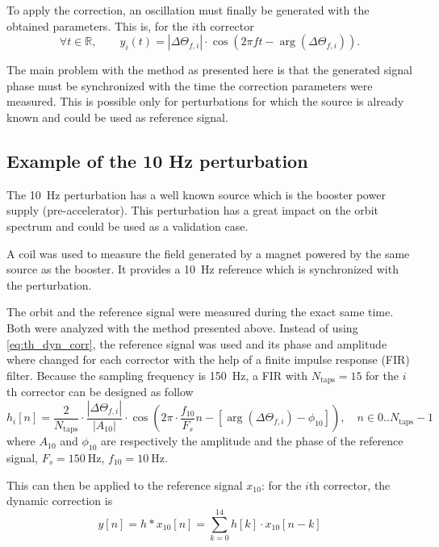 To apply the correction, an oscillation must finally be generated with the obtained parameters. This is, for the $i$th corrector
\begin{equation}\label{eq:th_dyn_corr}
\forall t \in  \mathbb{R}, \qquad y_i(t) = \left| \Delta\Theta_{f,i} \right| \cdot \cos\left(2 \pi f t - \arg\left(\Delta\Theta_{f,i}\right)\right).
\end{equation}

The main problem with the method as presented here is that the generated signal phase must be synchronized with the time the correction parameters were measured. This is possible only for perturbations for which the source is already known and could be used as reference signal.

\subsection{Example of the 10 Hz perturbation}
\label{sec:dyn_corr_ex_10Hz}
The \SI{10}{\hertz} perturbation has a well known source which is the booster power supply (pre-accelerator). This perturbation has a great impact on the orbit spectrum and could be used as a validation case.

A coil was used to measure the field generated by a magnet powered by the same source as the booster. It provides a \SI{10}{\hertz} reference which is synchronized with the perturbation.

The orbit and the reference signal were measured during the exact same time. Both were analyzed with the method presented above. Instead of using \cref{eq:th_dyn_corr}, the reference signal was used and its phase and amplitude where changed for each corrector with the help of a finite impulse response (FIR) filter. Because the sampling frequency is \SI{150}{\hertz}, a FIR with $N_\text{taps} = 15$ for the $i$th corrector can be designed as follow
\begin{equation}
	h_i[n] = \frac{2}{N_\text{taps}}\cdot \frac{\left| \Delta\Theta_{f,i} \right|}{\left|A_{10}\right|} \cdot \cos\left(2\pi\cdot \frac{f_{10}}{F_s} n - \left[\arg\left(\Delta\Theta_{f,i}\right) - \phi_{10}\right] \right),\quad n \in 0..N_\text{taps}-1
\end{equation}
where $A_{10}$ and $\phi_{10}$ are respectively the amplitude and the phase of the reference signal, $F_s=\SI{150}{\hertz}$, $f_{10}=\SI{10}{\hertz}$.

This can then be applied to the reference signal $x_{10}$: for the $i$th corrector, the dynamic correction is
\begin{equation}
y[n] = h * x_{10} [n] =  \sum\limits_{k=0}^{14} h[k] \cdot x_{10}[n-k]
\end{equation}

